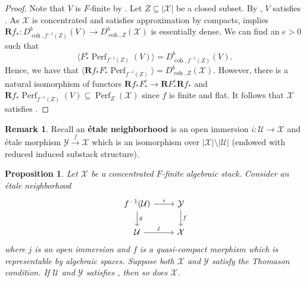 \documentclass[11pt]{amsart}
\theoremstyle{plain}
\newtheorem{proposition}[theorem]{Proposition}
\theoremstyle{definition}
\newtheorem{remark}[theorem]{Remark}
\numberwithin{equation}{section}
\numberwithin{theorem}{section}
\begin{document}
\begin{proof}
    Note that $V$ is $F$-finite by . Let $Z\subseteq |\mathcal{X}|$ be a closed subset. 
    By , $V$ satisfies . 
    As $\mathcal{X}$ is concentrated and satisfies approximation by compacts,  implies $\mathbf{R} f_\ast \colon D^b_{\operatorname{coh},f^{-1}(Z)}(V) \to D^b_{\operatorname{coh},Z}(\mathcal{X})$ is essentially dense. 
    We can find an $e>0$ such that 
    \begin{displaymath}
        \langle F_\ast^e \operatorname{Perf}_{f^{-1} (Z)} (V) \rangle = D^b_{\operatorname{coh},f^{-1}(Z)}(V).
    \end{displaymath}
    Hence, we have that $\langle \mathbf{R} f_\ast F_\ast^e \operatorname{Perf}_{f^{-1} (Z)} \rangle = D_{\operatorname{coh},Z}^b(\mathcal{X})$. 
    However, there is a natural isomorphism of functors $\mathbf{R} f_\ast F_\ast^e \to \mathbf{R} F_\ast^e \mathbf{R} f_\ast$ and $\mathbf{R}f_\ast\operatorname{Perf}_{f^{-1} (Z)} (V) \subseteq \operatorname{Perf}_Z(\mathcal{X})$ since $f$ is finite and flat.
    It follows that $\mathcal{X}$ satisfies . 
\end{proof}

\begin{remark}
    Recall an \textbf{\'{e}tale neighborhood} is an open immersion $i\colon \mathcal{U} \to \mathcal{X}$ and \'{e}tale morphism $\mathcal{Y} \xrightarrow{f} \mathcal{X}$ which is an isomorphism over $|\mathcal{X}|\setminus |\mathcal{U}|$ (endowed with reduced induced substack structure).
\end{remark}

\begin{proposition}
    \label{prop:etale_nbhd}
    Let $\mathcal{X}$ be a concentrated $F$-finite algebraic stack. 
    Consider an \'{e}tale neighborhood
    \begin{displaymath}
        \begin{tikzcd}
            f^{-1}(\mathcal{U})\arrow[r,"i"]\arrow[d,"g"] & \mathcal{Y}\arrow[d,"f"]\\
            \mathcal{U}\arrow[r,"j"] & \mathcal{X}
        \end{tikzcd}
    \end{displaymath}
    where $j$ is an open immersion and $f$ is a quasi-compact morphism which is representable by algebraic spaces. 
    Suppose both $\mathcal{X}$ and $\mathcal{Y}$ satisfy the Thomason condition. 
    If $\mathcal{U}$ and $\mathcal{Y}$ satisfies , then so does $\mathcal{X}$. 
\end{proposition}
\end{document}

